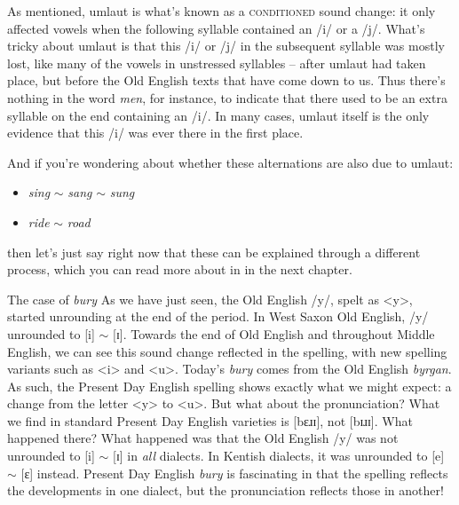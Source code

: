 As mentioned, umlaut is what's known as a \textsc{conditioned} sound change: it only affected vowels when the following syllable contained an /i/ or a /j/. What's tricky about umlaut is that this /i/ or /j/ in the subsequent syllable was mostly lost, like many of the vowels in unstressed syllables -- after umlaut had taken place, but before the Old English texts that have come down to us. Thus there's nothing in the word \emph{men}, for instance, to indicate that there used to be an extra syllable on the end containing an /i/. In many cases, umlaut itself is the only evidence that this /i/ was ever there in the first place.

And if you're wondering about whether these alternations are also due to umlaut:

\begin{itemize}
    \item \textit{sing} $\sim$ \textit{sang} $\sim$ \textit{sung}
    \item \textit{ride} $\sim$ \textit{road}
\end{itemize}

\noindent then let's just say right now that these can be explained through a different process, which you can read more about in  in the next chapter.


\begin{soundbox}{The case of \textit{bury}}
As we have just seen, the Old English /y/, spelt as <y>, started unrounding at the end of the period. In West Saxon Old English, /y/ unrounded to [i] $\sim$ [ɪ]. Towards the end of Old English and throughout Middle English, we can see this sound change reflected in the spelling, with new spelling variants such as <i> and <u>. Today's \textit{bury} comes from the Old English \textit{byrgan}. As such, the Present Day English spelling shows exactly what we might expect: a change from the letter <y> to <u>. But what about the pronunciation? What we find in standard Present Day English varieties is [bɛɹɪ], not [bɪɹɪ]. What happened there? What happened was that the Old English /y/ was not unrounded to [i] $\sim$ [ɪ] in \textit{all} dialects. In Kentish dialects, it was unrounded to [e] $\sim$ [ɛ] instead. Present Day English \textit{bury} is fascinating in that the spelling reflects the developments in one dialect, but the pronunciation reflects those in another!
\end{soundbox}


